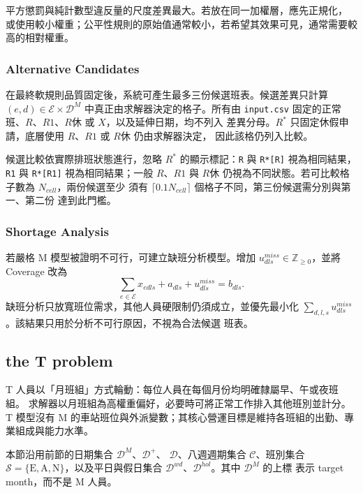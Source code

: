\documentclass[12pt]{article}
\begin{document}
平方懲罰與純計數型違反量的尺度差異最大。若放在同一加權層，應先正規化，
或使用較小權重；公平性規則的原始值通常較小，若希望其效果可見，通常需要較
高的相對權重。

\subsubsection{Alternative Candidates}

在最終軟規則品質固定後，系統可產生最多三份候選班表。候選差異只計算
\((e,d)\in\mathcal{E}\times\mathcal{D}^{M}\) 中真正由求解器決定的格子。所有由
\texttt{input.csv} 固定的正常班、\(R\)、\(R1\)、\(R休\) 或 \(X\)，以及延伸日期，均不列入
差異分母。\(R^*\) 只固定休假申請，底層使用 \(R\)、\(R1\) 或 \(R休\) 仍由求解器決定，
因此該格仍列入比較。

候選比較依實際排班狀態進行，忽略 \(R^*\) 的顯示標記：\texttt{R} 與
\texttt{R*[R]} 視為相同結果，\texttt{R1} 與 \texttt{R*[R1]} 視為相同結果；一般
\(R\)、\(R1\) 與 \(R休\) 仍視為不同狀態。若可比較格子數為 \(N_{cell}\)，兩份候選至少
須有 \(\lceil0.1N_{cell}\rceil\) 個格子不同，第三份候選需分別與第一、第二份
達到此門檻。

\subsubsection{Shortage Analysis}

若嚴格 M 模型被證明不可行，可建立缺班分析模型。增加
\(u^{miss}_{dls}\in\mathbb{Z}_{\geq 0}\)，並將 Coverage 改為
\[
  \sum_{e\in\mathcal{E}}x_{edls}+a_{dls}+u^{miss}_{dls}=b_{dls}.
\]
缺班分析只放寬班位需求，其他人員硬限制仍須成立，並優先最小化
\(\sum_{d,l,s}u^{miss}_{dls}\)。該結果只用於分析不可行原因，不視為合法候選
班表。

\subsection{the T problem}

T 人員以「月班組」方式輪動：每位人員在每個月份均明確隸屬早、午或夜班組。
求解器以月班組為高權重偏好，必要時可將正常工作排入其他班別並計分。T 模型沒有
M 的車站班位與外派變數；其核心營運目標是維持各班組的出勤、專業組成與能力水準。

本節沿用前節的日期集合 \(\mathcal{D}^{M}\)、\(\mathcal{D}^{+}\)、
\(\mathcal{D}\)、八週週期集合 \(\mathcal{C}\)、班別集合
\(\mathcal{S}=\{\mathrm{E},\mathrm{A},\mathrm{N}\}\)，以及平日與假日集合
\(\mathcal{D}^{wd}\)、\(\mathcal{D}^{hol}\)。其中 \(\mathcal{D}^{M}\) 的上標
表示 target month，而不是 M 人員。
\end{document}
